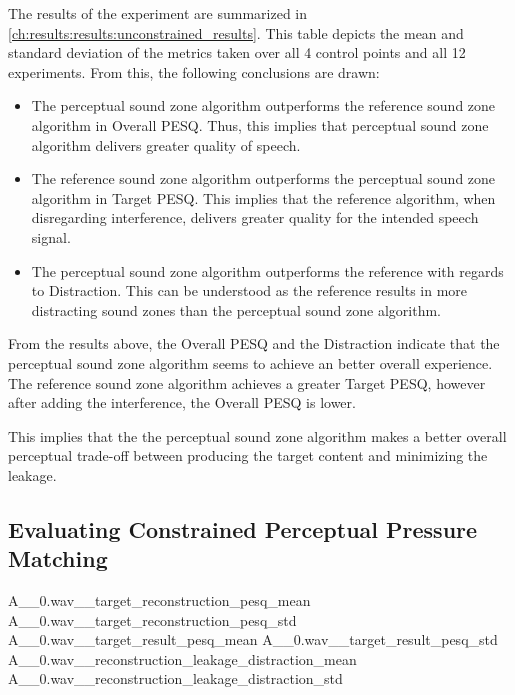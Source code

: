 The results of the experiment are summarized in \autoref{ch:results:results:unconstrained_results}.
This table depicts the mean and standard deviation of the metrics taken over all 4 control points and all 12 experiments.
From this, the following conclusions are drawn:
\begin{itemize}
    \item The perceptual sound zone algorithm outperforms the reference sound zone algorithm in Overall PESQ.
        Thus, this implies that perceptual sound zone algorithm delivers greater quality of speech.
    \item The reference sound zone algorithm outperforms the perceptual sound zone algorithm in Target PESQ.
        This implies that the reference algorithm, when disregarding interference, delivers greater quality for the intended speech signal.
    \item The perceptual sound zone algorithm outperforms the reference with regards to Distraction.
        This can be understood as the reference results in more distracting sound zones than the perceptual sound zone algorithm.
\end{itemize}
From the results above, the Overall PESQ and the Distraction indicate that the perceptual sound zone algorithm seems to 
achieve an better overall experience.
The reference sound zone algorithm achieves a greater Target PESQ, however after adding the interference, the Overall PESQ is lower.

This implies that the the perceptual sound zone algorithm makes a better overall perceptual trade-off between producing the target content 
and minimizing the leakage.

\subsection{Evaluating Constrained Perceptual Pressure Matching}

\constrainingplot
{A__0.wav__target_reconstruction_pesq_mean}
{A__0.wav__target_reconstruction_pesq_std}
{A__0.wav__target_result_pesq_mean}
{A__0.wav__target_result_pesq_std}
{A__0.wav__reconstruction_leakage_distraction_mean}
{A__0.wav__reconstruction_leakage_distraction_std}
